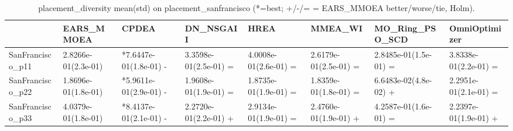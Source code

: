 \begin{table}[t]
\centering
\caption{placement_diversity mean(std) on placement_sanfrancisco (*=best; +/-/= = EARS_MMOEA better/worse/tie, Holm).}
\label{tab:placement_sanfrancisco_placement_diversity}
\begin{tabular}{llllllll}
\toprule
 & EARS\_MMOEA & CPDEA & DN\_NSGAII & HREA & MMEA\_WI & MO\_Ring\_PSO\_SCD & OmniOptimizer \\
\midrule
SanFrancisco\_p11 & 2.8266e-01(2.3e-01) & *7.6447e-01(1.8e-01) - & 3.3598e-01(2.5e-01) = & 4.0008e-01(2.6e-01) = & 2.6179e-01(2.5e-01) = & 2.8485e-01(1.5e-01) = & 3.8338e-01(2.2e-01) = \\
SanFrancisco\_p22 & 1.8696e-01(1.8e-01) & *5.9611e-01(2.9e-01) - & 1.9608e-01(1.9e-01) = & 1.8735e-01(1.9e-01) = & 1.8359e-01(1.8e-01) = & 6.6483e-02(4.8e-02) + & 2.2951e-01(2.1e-01) = \\
SanFrancisco\_p33 & 4.0379e-01(1.8e-01) & *8.4137e-01(2.1e-01) - & 2.2720e-01(2.2e-01) + & 2.9134e-01(1.9e-01) = & 2.4760e-01(1.9e-01) + & 4.2587e-01(1.6e-01) = & 2.2397e-01(1.9e-01) + \\
\bottomrule
\end{tabular}
\end{table}
